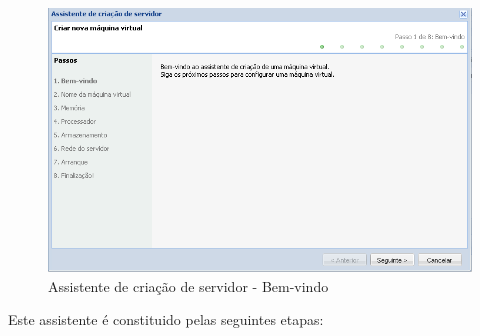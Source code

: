 \begin{figure}[H]
	\begin{center}
	\includegraphics[scale=0.5]{screenshots/server_createwiz.png}
	\caption{Assistente de criação de servidor - Bem-vindo}
	\label{fig:server_createwiz}
	\end{center}
\end{figure}
Este assistente é constituido pelas seguintes etapas:
